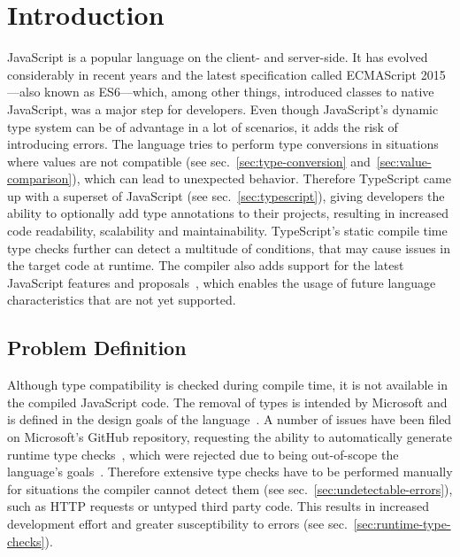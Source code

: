 \chapter{Introduction}
\label{cha:introduction}

JavaScript is a popular language on the client- and server-side. It has evolved considerably in recent years and the latest specification called ECMAScript 2015---also known as ES6---which, among other things, introduced classes to native JavaScript, was a major step for developers. Even though JavaScript's dynamic type system can be of advantage in a lot of scenarios, it adds the risk of introducing errors. The language tries to perform type conversions in situations where values are not compatible (see sec.~\ref{sec:type-conversion} and~\ref{sec:value-comparison}), which can lead to unexpected behavior. Therefore TypeScript came up with a superset of JavaScript (see sec.~\ref{sec:typescript}), giving developers the ability to optionally add type annotations to their projects, resulting in increased code readability, scalability and maintainability. TypeScript's static compile time type checks further can detect a multitude of conditions, that may cause issues in the target code at runtime. The compiler also adds support for the latest JavaScript features and proposals~\cites{TypeScriptHandbook:CompilerOptions, TypeScriptWebsite}, which enables the usage of future language characteristics that are not yet supported.


\section{Problem Definition}
\label{sec:problem-definition}

Although type compatibility is checked during compile time, it is not available in the compiled JavaScript code. The removal of types is intended by Microsoft and is defined in the design goals of the language~\cite{TypeScriptWiki:DesignGoals}. A number of issues have been filed on Microsoft's GitHub repository, requesting the ability to automatically generate runtime type checks~\cites{TypeScriptIssue:RuntimeTypeChecking, TypeScriptIssue:RuntimeTypeChecks, TypeScriptIssue:EmitTypeArguments}, which were rejected due to being out-of-scope the language's goals~\cites{TypeScriptIssue:RuntimeTypeChecking:Comment:OutOfScope, TypeScriptIssue:EmitTypeArguments:Comment:OutOfScope}. Therefore extensive type checks have to be performed manually for situations the compiler cannot detect them (see sec.~\ref{sec:undetectable-errors}), such as HTTP requests or untyped third party code. This results in increased development effort and greater susceptibility to errors (see sec.~\ref{sec:runtime-type-checks}).

